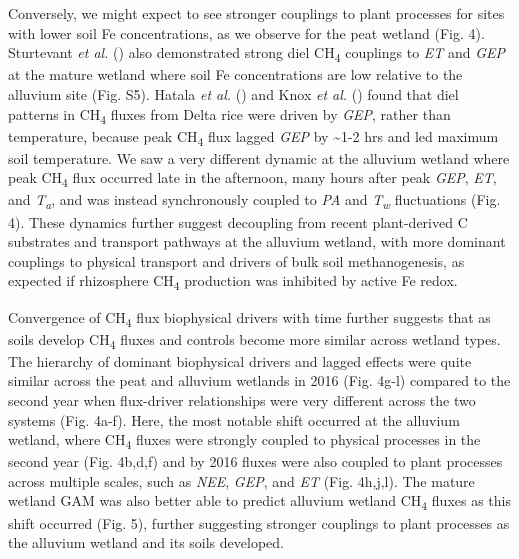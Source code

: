 \documentclass[
  12pt,
]{article}
\begin{document}
Conversely, we might expect to see stronger couplings to plant processes
for sites with lower soil Fe concentrations, as we observe for the peat
wetland (Fig. 4). Sturtevant \emph{et al.}
() also demonstrated
strong diel CH\textsubscript{4} couplings to \emph{ET} and \emph{GEP} at
the mature wetland where soil Fe concentrations are low relative to the
alluvium site (Fig. S5). Hatala \emph{et al.}
() and Knox \emph{et al.}
() found that diel patterns in
CH\textsubscript{4} fluxes from Delta rice were driven by \emph{GEP},
rather than temperature, because peak CH\textsubscript{4} flux lagged
\emph{GEP} by \textasciitilde1-2 hrs and led maximum soil temperature.
We saw a very different dynamic at the alluvium wetland where peak
CH\textsubscript{4} flux occurred late in the afternoon, many hours
after peak \emph{GEP}, \emph{ET}, and \emph{T\textsubscript{a}}, and was
instead synchronously coupled to \emph{PA} and \emph{T\textsubscript{w}}
fluctuations (Fig. 4). These dynamics further suggest decoupling from
recent plant-derived C substrates and transport pathways at the alluvium
wetland, with more dominant couplings to physical transport and drivers
of bulk soil methanogenesis, as expected if rhizosphere
CH\textsubscript{4} production was inhibited by active Fe redox.

Convergence of CH\textsubscript{4} flux biophysical drivers with time
further suggests that as soils develop CH\textsubscript{4} fluxes and
controls become more similar across wetland types. The hierarchy of
dominant biophysical drivers and lagged effects were quite similar
across the peat and alluvium wetlands in 2016 (Fig. 4g-l) compared to
the second year when flux-driver relationships were very different
across the two systems (Fig. 4a-f). Here, the most notable shift
occurred at the alluvium wetland, where CH\textsubscript{4} fluxes were
strongly coupled to physical processes in the second year (Fig. 4b,d,f)
and by 2016 fluxes were also coupled to plant processes across multiple
scales, such as \emph{NEE}, \emph{GEP}, and \emph{ET} (Fig. 4h,j,l). The
mature wetland GAM was also better able to predict alluvium wetland
CH\textsubscript{4} fluxes as this shift occurred (Fig. 5), further
suggesting stronger couplings to plant processes as the alluvium wetland
and its soils developed.
\end{document}
